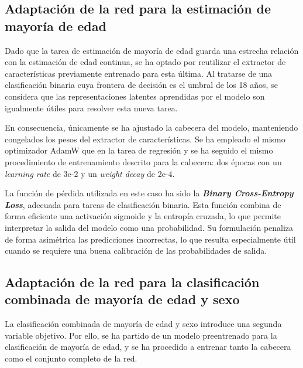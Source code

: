 
\subsection{Adaptación de la red para la estimación de mayoría de edad}

Dado que la tarea de estimación de mayoría de edad guarda una estrecha relación con la estimación de edad 
continua, se ha optado por reutilizar el extractor de características previamente entrenado para esta última. 
Al tratarse de una clasificación binaria cuya frontera de decisión es el umbral de los 18 años, se considera 
que las representaciones latentes aprendidas por el modelo son igualmente útiles para resolver esta nueva 
tarea.

En consecuencia, únicamente se ha ajustado la cabecera del modelo, manteniendo congelados los pesos del 
extractor de características. Se ha empleado el mismo optimizador AdamW que en la tarea de regresión y se ha 
seguido el mismo procedimiento de entrenamiento descrito para la cabecera: dos épocas con un 
\textit{learning rate} de 3e-2 y un \textit{weight decay} de 2e-4.

La función de pérdida utilizada en este caso ha sido la \textbf{\textit{Binary Cross-Entropy Loss}}, 
adecuada para tareas de clasificación binaria. Esta función combina de forma eficiente una activación 
sigmoide y la entropía cruzada, lo que permite interpretar la salida del modelo como una probabilidad. 
Su formulación penaliza de forma asimétrica las predicciones incorrectas, lo 
que resulta especialmente útil cuando se requiere una buena calibración de las probabilidades de salida.


\subsection{Adaptación de la red para la clasificación combinada de mayoría de edad y sexo}

La clasificación combinada de mayoría de edad y sexo introduce una segunda variable objetivo. Por ello, se 
ha partido de un modelo preentrenado para la clasificación de mayoría de edad, y se ha procedido a entrenar 
tanto la cabecera como el conjunto completo de la red.

